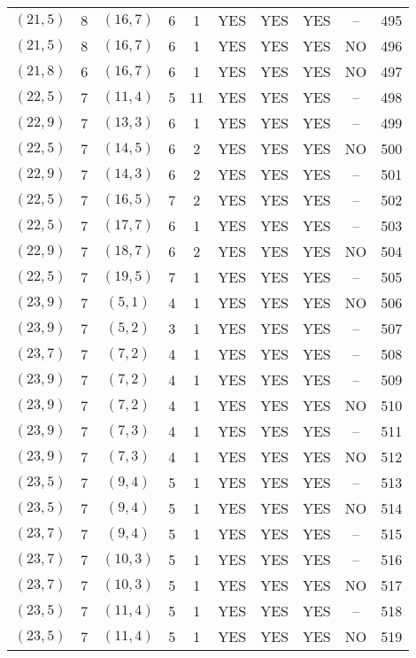 \begin{longtable}{|c|c|c|c|c|c|c|c|c|c|}
$(21, 5)$ & 8 & $(16, 7)$ & 6 & 1 & YES & YES & YES & -- & 495\\
$(21, 5)$ & 8 & $(16, 7)$ & 6 & 1 & YES & YES & YES & NO & 496\\
$(21, 8)$ & 6 & $(16, 7)$ & 6 & 1 & YES & YES & YES & NO & 497\\
$(22, 5)$ & 7 & $(11, 4)$ & 5 & 11 & YES & YES & YES & -- & 498\\
$(22, 9)$ & 7 & $(13, 3)$ & 6 & 1 & YES & YES & YES & -- & 499\\
$(22, 5)$ & 7 & $(14, 5)$ & 6 & 2 & YES & YES & YES & NO & 500\\
$(22, 9)$ & 7 & $(14, 3)$ & 6 & 2 & YES & YES & YES & -- & 501\\
$(22, 5)$ & 7 & $(16, 5)$ & 7 & 2 & YES & YES & YES & -- & 502\\
$(22, 5)$ & 7 & $(17, 7)$ & 6 & 1 & YES & YES & YES & -- & 503\\
$(22, 9)$ & 7 & $(18, 7)$ & 6 & 2 & YES & YES & YES & NO & 504\\
$(22, 5)$ & 7 & $(19, 5)$ & 7 & 1 & YES & YES & YES & -- & 505\\
$(23, 9)$ & 7 & $(5, 1)$ & 4 & 1 & YES & YES & YES & NO & 506\\
$(23, 9)$ & 7 & $(5, 2)$ & 3 & 1 & YES & YES & YES & -- & 507\\
$(23, 7)$ & 7 & $(7, 2)$ & 4 & 1 & YES & YES & YES & -- & 508\\
$(23, 9)$ & 7 & $(7, 2)$ & 4 & 1 & YES & YES & YES & -- & 509\\
$(23, 9)$ & 7 & $(7, 2)$ & 4 & 1 & YES & YES & YES & NO & 510\\
$(23, 9)$ & 7 & $(7, 3)$ & 4 & 1 & YES & YES & YES & -- & 511\\
$(23, 9)$ & 7 & $(7, 3)$ & 4 & 1 & YES & YES & YES & NO & 512\\
$(23, 5)$ & 7 & $(9, 4)$ & 5 & 1 & YES & YES & YES & -- & 513\\
$(23, 5)$ & 7 & $(9, 4)$ & 5 & 1 & YES & YES & YES & NO & 514\\
$(23, 7)$ & 7 & $(9, 4)$ & 5 & 1 & YES & YES & YES & -- & 515\\
$(23, 7)$ & 7 & $(10, 3)$ & 5 & 1 & YES & YES & YES & -- & 516\\
$(23, 7)$ & 7 & $(10, 3)$ & 5 & 1 & YES & YES & YES & NO & 517\\
$(23, 5)$ & 7 & $(11, 4)$ & 5 & 1 & YES & YES & YES & -- & 518\\
$(23, 5)$ & 7 & $(11, 4)$ & 5 & 1 & YES & YES & YES & NO & 519\\

\end{longtable}
